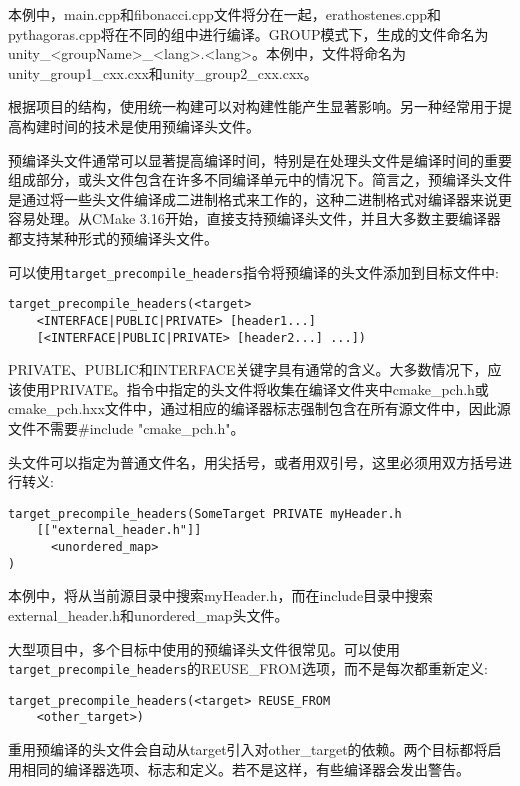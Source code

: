 本例中，main.cpp和fibonacci.cpp文件将分在一起，erathostenes.cpp和pythagoras.cpp将在不同的组中进行编译。GROUP模式下，生成的文件命名为unity\_<groupName>\_<lang>.<lang>。本例中，文件将命名为unity\_group1\_cxx.cxx和unity\_group2\_cxx.cxx。

根据项目的结构，使用统一构建可以对构建性能产生显著影响。另一种经常用于提高构建时间的技术是使用预编译头文件。


预编译头文件通常可以显著提高编译时间，特别是在处理头文件是编译时间的重要组成部分，或头文件包含在许多不同编译单元中的情况下。简言之，预编译头文件是通过将一些头文件编译成二进制格式来工作的，这种二进制格式对编译器来说更容易处理。从CMake 3.16开始，直接支持预编译头文件，并且大多数主要编译器都支持某种形式的预编译头文件。

可以使用\texttt{target\_precompile\_headers}指令将预编译的头文件添加到目标文件中:

\begin{lstlisting}[style=styleCMake]
target_precompile_headers(<target>
	<INTERFACE|PUBLIC|PRIVATE> [header1...]
	[<INTERFACE|PUBLIC|PRIVATE> [header2...] ...])
\end{lstlisting}

PRIVATE、PUBLIC和INTERFACE关键字具有通常的含义。大多数情况下，应该使用PRIVATE。指令中指定的头文件将收集在编译文件夹中cmake\_pch.h或cmake\_pch.hxx文件中，通过相应的编译器标志强制包含在所有源文件中，因此源文件不需要\#include "cmake\_pch.h"。

头文件可以指定为普通文件名，用尖括号，或者用双引号，这里必须用双方括号进行转义:

\begin{lstlisting}[style=styleCMake]
target_precompile_headers(SomeTarget PRIVATE myHeader.h
	[["external_header.h"]]
	  <unordered_map>
)
\end{lstlisting}

本例中，将从当前源目录中搜索myHeader.h，而在include目录中搜索external\_header.h和unordered\_map头文件。

大型项目中，多个目标中使用的预编译头文件很常见。可以使用\texttt{target\_precompile\_headers}的REUSE\_FROM选项，而不是每次都重新定义:

\begin{lstlisting}[style=styleCMake]
target_precompile_headers(<target> REUSE_FROM
	<other_target>)
\end{lstlisting}

重用预编译的头文件会自动从target引入对other\_target的依赖。两个目标都将启用相同的编译器选项、标志和定义。若不是这样，有些编译器会发出警告。

